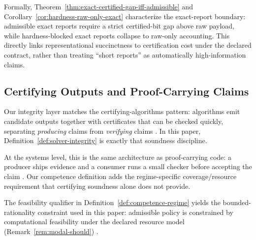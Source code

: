Formally, Theorem~\ref{thm:exact-certified-gap-iff-admissible} and Corollary~\ref{cor:hardness-raw-only-exact} characterize the exact-report boundary: admissible exact reports require a strict certified-bit gap above raw payload, while hardness-blocked exact reports collapse to raw-only accounting. This directly links representational succinctness to certification cost under the declared contract, rather than treating ``short reports'' as automatically high-information claims.

\subsection{Certifying Outputs and Proof-Carrying Claims}

Our integrity layer matches the certifying-algorithms pattern: algorithms emit candidate outputs together with certificates that can be checked quickly, separating \emph{producing} claims from \emph{verifying} claims \cite{mcconnell2010certifying,necula1997proof}. In this paper, Definition~\ref{def:solver-integrity} is exactly that soundness discipline.

At the systems level, this is the same architecture as proof-carrying code: a producer ships evidence and a consumer runs a small checker before accepting the claim \cite{necula1997proof,mcconnell2010certifying}. Our competence definition adds the regime-specific coverage/resource requirement that certifying soundness alone does not provide.

The feasibility qualifier in Definition~\ref{def:competence-regime} yields the bounded-rationality constraint used in this paper: admissible policy is constrained by computational feasibility under the declared resource model (Remark~\ref{rem:modal-should}) \cite{sep_bounded_rationality,arora2009computational}.

